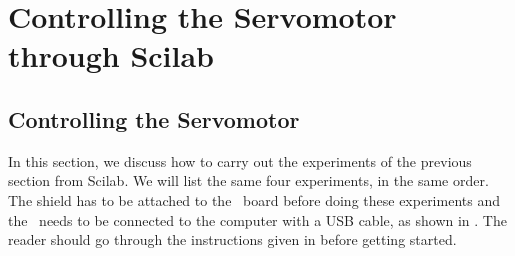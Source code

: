 \section{Controlling the Servomotor through Scilab}
\subsection{Controlling the Servomotor}
\label{sec:servo-sci}
In this section, we discuss how to carry out the experiments of the
previous section from Scilab. We will list the same four experiments,
in the same order.  The shield has to be attached to the \arduino\ board
before doing these experiments and the \arduino\ needs to be connected to the computer 
with a USB cable, as shown in .
The reader should go through the instructions given in
 before getting started. 

